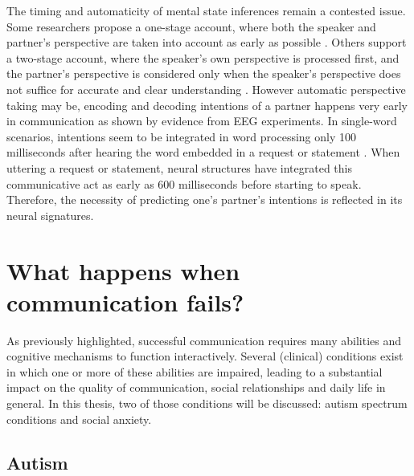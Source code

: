 The timing and automaticity of mental state inferences remain a contested issue. Some researchers propose a one-stage account, where both the speaker and partner's perspective are taken into account as early as possible \citep{brennan2009}. Others support a two-stage account, where the speaker's own perspective is processed first, and the partner's perspective is considered only when the speaker's perspective does not suffice for accurate and clear understanding \citep{barr2002}. However automatic perspective taking may be, encoding and decoding intentions of a partner happens very early in communication as shown by evidence from EEG experiments. In single-word scenarios, intentions seem to be integrated in word processing only 100 milliseconds after hearing the word embedded in a request or statement \citep{tomasello2022}. When uttering a request or statement, neural structures have integrated this communicative act as early as 600 milliseconds before starting to speak. Therefore, the necessity of predicting one's partner's intentions is reflected in its neural signatures.

\section{What happens when communication fails?}

As previously highlighted, successful communication requires many abilities and cognitive mechanisms to function interactively. Several (clinical) conditions exist in which one or more of these abilities are impaired, leading to a substantial impact on the quality of communication, social relationships and daily life in general. In this thesis, two of those conditions will be discussed: autism spectrum conditions and social anxiety.  

\subsection{Autism}

